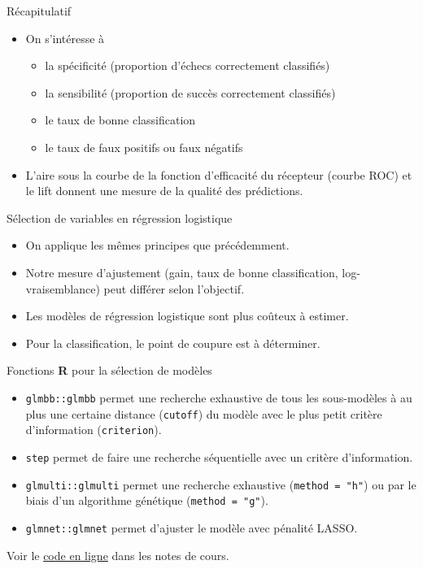 \documentclass[
  ignorenonframetext,
]{beamer}
\providecommand{\tightlist}{%
  \setlength{\itemsep}{0pt}\setlength{\parskip}{0pt}}\usepackage{longtable,booktabs,array}
\begin{document}
\begin{frame}{Récapitulatif}
\protect\hypertarget{ruxe9capitulatif-1}{}
\begin{itemize}
\tightlist
\item
  On s'intéresse à

  \begin{itemize}
  \tightlist
  \item
    la spécificité (proportion d'échecs correctement classifiés)
  \item
    la sensibilité (proportion de succès correctement classifiés)
  \item
    le taux de bonne classification
  \item
    le taux de faux positifs ou faux négatifs
  \end{itemize}
\item
  L'aire sous la courbe de la fonction d'efficacité du récepteur (courbe
  ROC) et le lift donnent une mesure de la qualité des prédictions.
\end{itemize}
\end{frame}

\begin{frame}{Sélection de variables en régression logistique}
\protect\hypertarget{suxe9lection-de-variables-en-ruxe9gression-logistique}{}
\begin{itemize}
\tightlist
\item
  On applique les mêmes principes que précédemment.
\item
  Notre mesure d'ajustement (gain, taux de bonne classification,
  log-vraisemblance) peut différer selon l'objectif.
\item
  Les modèles de régression logistique sont plus coûteux à estimer.
\item
  Pour la classification, le point de coupure est à déterminer.
\end{itemize}
\end{frame}

\begin{frame}[fragile]{Fonctions \textbf{R} pour la sélection de
modèles}
\protect\hypertarget{fonctions-r-pour-la-suxe9lection-de-moduxe8les}{}
\begin{itemize}
\tightlist
\item
  \texttt{glmbb::glmbb} permet une recherche exhaustive de tous les
  sous-modèles à au plus une certaine distance (\texttt{cutoff}) du
  modèle avec le plus petit critère d'information (\texttt{criterion}).
\item
  \texttt{step} permet de faire une recherche séquentielle avec un
  critère d'information.
\item
  \texttt{glmulti::glmulti} permet une recherche exhaustive
  (\texttt{method\ =\ "h"}) ou par le biais d'un algorithme génétique
  (\texttt{method\ =\ "g"}).
\item
  \texttt{glmnet::glmnet} permet d'ajuster le modèle avec pénalité
  LASSO.
\end{itemize}

Voir le
\href{https://lbelzile.github.io/math60602/05-reglogistique.html\#s\%C3\%A9lection-de-variables-en-r\%C3\%A9gression-logistique}{code
en ligne} dans les notes de cours.
\end{frame}
\end{document}
